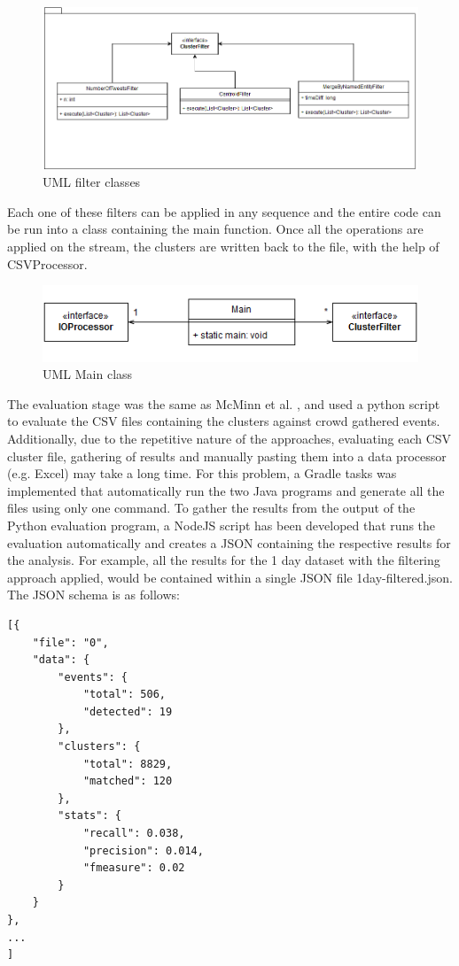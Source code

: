 \documentclass[a4paper,portrait,12pt]{article}
\begin{document}
\begin{figure}[h!]
	\centering
	\includegraphics[width=0.7\linewidth]{images/filterUML.png}
	\caption{UML filter classes}
	\label{fig:filterUML}
\end{figure}

Each one of these filters can be applied in any sequence and the entire code can be run into a class containing the main function.
Once all the operations are applied on the stream, the clusters are written back to the file, with the help of CSVProcessor.

\begin{figure}[h!]
	\centering
	\includegraphics[width=0.7\linewidth]{images/mainUML.png}
	\caption{UML Main class}
	\label{fig:mainUML}
\end{figure}

The evaluation stage was the same as McMinn et al. \cite{McMinn2013}, and used a python script to evaluate the CSV files containing the clusters against crowd gathered events.
Additionally, due to the repetitive nature of the approaches, evaluating each CSV cluster file, gathering of results and manually pasting them into a data processor (e.g. Excel) may take a long time.
For this problem, a Gradle tasks was implemented that automatically run the two Java programs and generate all the files using only one command.
To gather the results from the output of the Python evaluation program, a NodeJS script has been developed that runs the evaluation automatically and creates a JSON containing the respective results for the analysis.
For example, all the results for the 1 day dataset with the filtering approach applied, would be contained within a single JSON file 1day-filtered.json.
The JSON schema is as follows:
\begin{lstlisting}[caption=JSON Schema Example, label=json-schema]
[{
    "file": "0",
    "data": {
        "events": {
            "total": 506,
            "detected": 19
        },
        "clusters": {
            "total": 8829,
            "matched": 120
        },
        "stats": {
            "recall": 0.038,
            "precision": 0.014,
            "fmeasure": 0.02
        }
    }
},
...
]
\end{lstlisting}
\end{document}
